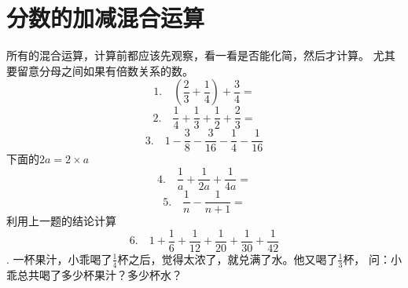 \section{分数的加减混合运算}
所有的混合运算，计算前都应该先观察，看一看是否能化简，然后才计算。
尤其要留意分母之间如果有倍数关系的数。
    \[1.\quad (\frac{2}{3} + \frac{1}{4}) + \frac{3}{4} = \]
        \vspace{1cm}
    \[2.\quad \frac{1}{4} + \frac{1}{3} + \frac{1}{2} + \frac{2}{3}  = \]
        \vspace{1cm}
    \[3.\quad 1 - \frac{3}{8}- \frac{3}{16} - \frac{1}{4} - \frac{1}{16} \]
        \vspace{1cm}
下面的$2a = 2\times a$
    \[4.\quad \frac{1}{a} + \frac{1}{2a} + \frac{1}{4a} = \]
        \vspace{1cm}
    \[5.\quad \frac{1}{n} - \frac{1}{n+1} = \]
        \vspace{1cm}
    利用上一题的结论计算
    \[6.\quad  1 + \frac{1}{6} + \frac{1}{12} + \frac{1}{20} + \frac{1}{30} + \frac{1}{42} \]
        \vspace{1cm}
        . 一杯果汁，小乖喝了$\frac{1}{4}$杯之后，觉得太浓了，就兑满了水。他又喝了$\frac{1}{3}$杯，
    问：小乖总共喝了多少杯果汁？多少杯水？
